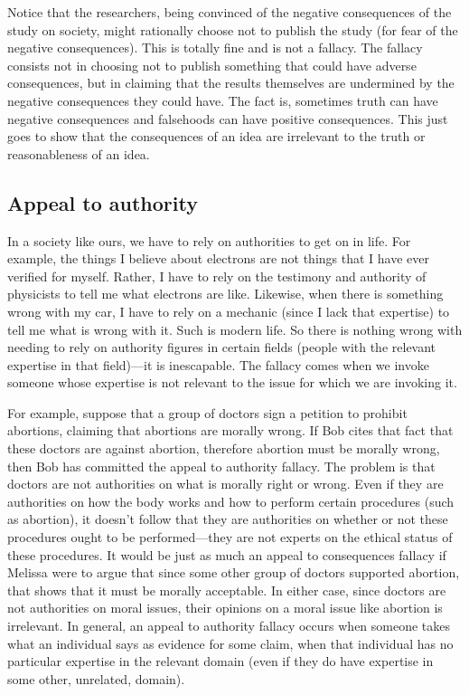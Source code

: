 Notice that the researchers, being convinced of the negative consequences of
the study on society, might rationally choose not to publish the study (for fear of
the negative consequences). This is totally fine and is not a fallacy. The fallacy
consists not in choosing not to publish something that could have adverse
consequences, but in claiming that the results themselves are undermined by
the negative consequences they could have. The fact is, sometimes truth can
have negative consequences and falsehoods can have positive consequences.
This just goes to show that the consequences of an idea are irrelevant to the
truth or reasonableness of an idea.

\subsection{Appeal to authority}

In a society like ours, we have to rely on authorities to get on in life. For example, the things I believe about electrons are not things that I have ever verified for myself. Rather, I have to rely on the testimony and authority of physicists to tell me what electrons are like. Likewise, when there is something wrong with my car, I have to rely on a mechanic (since I lack that expertise) to tell me what is wrong with it. Such is modern life. So there is nothing wrong with needing to rely on authority figures in certain fields (people with the relevant expertise in that field)---it is inescapable. The fallacy comes when we invoke someone whose expertise is not relevant to the issue for which we are invoking it.

For example, suppose that a group of doctors sign a petition to prohibit abortions, claiming that abortions are morally wrong. If Bob cites that fact that these doctors are against abortion, therefore abortion must be morally wrong, then Bob has committed the appeal to authority fallacy. The problem is that doctors are not authorities on what is morally right or wrong. Even if they are authorities on how the body works and how to perform certain procedures (such as abortion), it doesn't follow that they are authorities on whether or not these procedures ought to be performed---they are not experts on the ethical status of these procedures. It would be just as much an appeal to consequences fallacy if Melissa were to
argue that since some other group of doctors supported abortion, that shows that it must be morally acceptable. In either case, since doctors are not authorities on moral issues, their opinions on a moral issue like abortion is irrelevant. In general, an appeal to authority fallacy occurs when someone takes what an individual says as evidence for some claim, when that individual has no particular expertise in the relevant domain (even if they do have expertise in some other, unrelated, domain).
